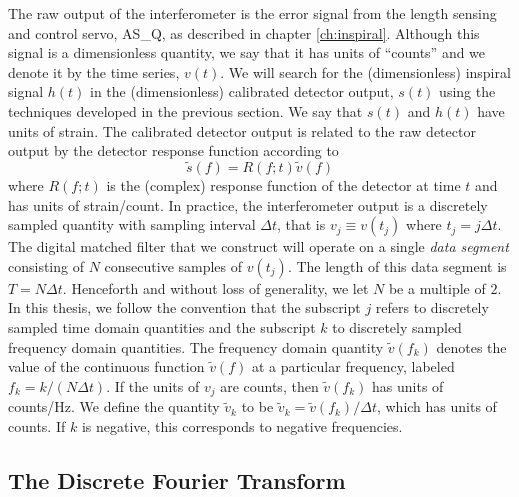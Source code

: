 The raw output of the interferometer is the error signal from the length
sensing and control servo, AS\_Q, as described in chapter \ref{ch:inspiral}.
Although this signal is a dimensionless quantity, we say that it has units of
``counts'' and we denote it by the time series, $v(t)$.  We will search for
the (dimensionless) inspiral signal $h(t)$ in the (dimensionless) calibrated
detector output, $s(t)$ using the techniques developed in the previous
section. We say that $s(t)$ and $h(t)$ have units of strain. The calibrated
detector output is related to the raw detector output by the detector response
function according
to \begin{equation}
\tilde{s}(f) = R(f;t) \tilde{v}(f)
\end{equation}
where $R(f;t)$ is the (complex) response function of the detector at time
$t$\cite{Adhikari:2003} and has units of strain/count.  In practice, the
interferometer output is a discretely sampled quantity with sampling interval
$\Delta t$, that is $v_j \equiv v(t_j)$ where $t_j = j\Delta t$.  The digital
matched filter that we construct will operate on a single \emph{data segment}
consisting of $N$ consecutive samples of $v(t_j)$. The length of this data
segment is $T = N\Delta t$.  Henceforth and without loss of generality, we let
$N$ be a multiple of $2$.  In this thesis, we follow the convention that the
subscript $j$ refers to discretely sampled time domain quantities and the
subscript $k$ to discretely sampled frequency domain quantities.  The
frequency domain quantity $\tilde{v}(f_k)$ denotes the value of the continuous
function $\tilde{v}(f)$ at a particular frequency, labeled $f_k = k/(N\Delta
t)$. If the units of $v_j$ are counts, then $\tilde{v}(f_k)$ has units of
counts/Hz. We define the quantity $\tilde{v}_k$ to be $\tilde{v}_k =
\tilde{v}(f_k) / \Delta t$, which has units of counts. If $k$ is negative,
this corresponds to negative frequencies.

\subsection{The Discrete Fourier Transform}
\label{ss:dft}

